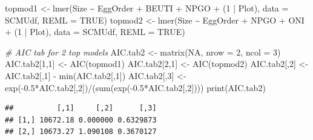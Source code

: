 \documentclass[
]{article}
\newenvironment{Shaded}{\begin{snugshade}}{\end{snugshade}}
\newcommand{\AttributeTok}[1]{\textcolor[rgb]{0.77,0.63,0.00}{#1}}
\newcommand{\CommentTok}[1]{\textcolor[rgb]{0.56,0.35,0.01}{\textit{#1}}}
\newcommand{\ConstantTok}[1]{\textcolor[rgb]{0.00,0.00,0.00}{#1}}
\newcommand{\DecValTok}[1]{\textcolor[rgb]{0.00,0.00,0.81}{#1}}
\newcommand{\FloatTok}[1]{\textcolor[rgb]{0.00,0.00,0.81}{#1}}
\newcommand{\FunctionTok}[1]{\textcolor[rgb]{0.00,0.00,0.00}{#1}}
\newcommand{\NormalTok}[1]{#1}
\newcommand{\OtherTok}[1]{\textcolor[rgb]{0.56,0.35,0.01}{#1}}
\newcommand{\SpecialCharTok}[1]{\textcolor[rgb]{0.00,0.00,0.00}{#1}}
\begin{document}
\begin{Shaded}
\begin{Highlighting}[]
\NormalTok{topmod1 }\OtherTok{\textless{}{-}} \FunctionTok{lmer}\NormalTok{(Size }\SpecialCharTok{\textasciitilde{}}\NormalTok{ EggOrder }\SpecialCharTok{+}\NormalTok{ BEUTI }\SpecialCharTok{+}\NormalTok{ NPGO }\SpecialCharTok{+}\NormalTok{ (}\DecValTok{1} \SpecialCharTok{|}\NormalTok{ Plot), }\AttributeTok{data =}\NormalTok{ SCMUdf, }\AttributeTok{REML =} \ConstantTok{TRUE}\NormalTok{)}
\NormalTok{topmod2 }\OtherTok{\textless{}{-}} \FunctionTok{lmer}\NormalTok{(Size }\SpecialCharTok{\textasciitilde{}}\NormalTok{ EggOrder }\SpecialCharTok{+}\NormalTok{ NPGO }\SpecialCharTok{+}\NormalTok{ ONI }\SpecialCharTok{+}\NormalTok{ (}\DecValTok{1} \SpecialCharTok{|}\NormalTok{ Plot), }\AttributeTok{data =}\NormalTok{ SCMUdf, }\AttributeTok{REML =} \ConstantTok{TRUE}\NormalTok{)}

\CommentTok{\# AIC tab for 2 top models}
\NormalTok{AIC.tab2 }\OtherTok{\textless{}{-}} \FunctionTok{matrix}\NormalTok{(}\ConstantTok{NA}\NormalTok{, }\AttributeTok{nrow =} \DecValTok{2}\NormalTok{, }\AttributeTok{ncol =} \DecValTok{3}\NormalTok{)}
\NormalTok{AIC.tab2[}\DecValTok{1}\NormalTok{,}\DecValTok{1}\NormalTok{] }\OtherTok{\textless{}{-}} \FunctionTok{AIC}\NormalTok{(topmod1)}
\NormalTok{AIC.tab2[}\DecValTok{2}\NormalTok{,}\DecValTok{1}\NormalTok{] }\OtherTok{\textless{}{-}} \FunctionTok{AIC}\NormalTok{(topmod2)}
\NormalTok{AIC.tab2[,}\DecValTok{2}\NormalTok{] }\OtherTok{\textless{}{-}}\NormalTok{ AIC.tab2[,}\DecValTok{1}\NormalTok{] }\SpecialCharTok{{-}} \FunctionTok{min}\NormalTok{(AIC.tab2[,}\DecValTok{1}\NormalTok{])}
\NormalTok{AIC.tab2[,}\DecValTok{3}\NormalTok{] }\OtherTok{\textless{}{-}} \FunctionTok{exp}\NormalTok{(}\SpecialCharTok{{-}}\FloatTok{0.5}\SpecialCharTok{*}\NormalTok{AIC.tab2[,}\DecValTok{2}\NormalTok{])}\SpecialCharTok{/}\NormalTok{(}\FunctionTok{sum}\NormalTok{(}\FunctionTok{exp}\NormalTok{(}\SpecialCharTok{{-}}\FloatTok{0.5}\SpecialCharTok{*}\NormalTok{AIC.tab2[,}\DecValTok{2}\NormalTok{])))}
\FunctionTok{print}\NormalTok{(AIC.tab2)}
\end{Highlighting}
\end{Shaded}

\begin{verbatim}
##          [,1]     [,2]      [,3]
## [1,] 10672.18 0.000000 0.6329873
## [2,] 10673.27 1.090108 0.3670127
\end{verbatim}
\end{document}
